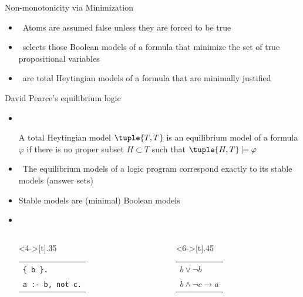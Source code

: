 \begin{frame}{Non-monotonicity via Minimization}
  \smallskip
  \begin{itemize}
  \item {} \ Atoms are assumed false unless they are forced to be true
    \smallskip
  \item<2->  \
    selects those Boolean models of a formula that minimize the set of true propositional variables
    \smallskip
  \item<3->  \
    are total Heytingian models of a formula that are minimally justified
  \end{itemize}
\end{frame}
\begin{frame}{David Pearce's equilibrium logic}
  \smallskip
  \begin{itemize}
  \item {} \

    A total Heytingian model $\tuple{T,T}$ is an \alert{equilibrium model} of a formula $\varphi$ if
    there is no proper subset $H \subset T$ such that $\tuple{H,T}\models\varphi$
    \medskip
  \item <2-> \structure{Theorem} \
    The equilibrium models of a logic program correspond exactly to its stable models (answer sets)
    \smallskip
  \item[] <3-> Stable models are (minimal) Boolean models
    \smallskip
  \item<4->  \
    \medskip
    \begin{columns}
      \begin{column}<4->[t]{.35\textwidth}
        \begin{tabular}[t]{l}
          \texttt{\{ b \}.}
          \\
          \texttt{a :- b, not c.}
        \end{tabular}%
        \par\medskip
      \end{column}
      \begin{column}<6->[t]{.45\textwidth}
        \begin{tabular}[t]{l}
          $b\vee\neg b$
          \\
          $b\wedge\neg c\to a$
        \end{tabular}%
        \par\medskip
      \end{column}
    \end{columns}
  \end{itemize}
\end{frame}
%
